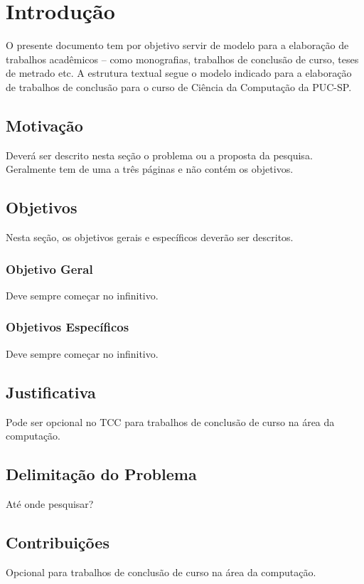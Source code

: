 \chapter{Introdução} \par
O presente documento tem por objetivo servir de modelo para a elaboração de trabalhos acadêmicos --  como monografias, trabalhos de conclusão de curso, teses de metrado etc. A estrutura textual segue o modelo indicado para a elaboração de trabalhos de conclusão para o curso de Ciência da Computação da PUC-SP. 

\section{Motivação}
Deverá ser descrito nesta seção o problema ou a proposta da pesquisa. Geralmente tem de uma a três páginas e não contém os objetivos.

\section{Objetivos}
Nesta seção, os objetivos gerais e específicos deverão ser descritos.

\subsection{Objetivo Geral}
Deve sempre começar no infinitivo.

\subsection{Objetivos Específicos}
Deve sempre começar no infinitivo.

\section{Justificativa}
Pode ser opcional no TCC para trabalhos de conclusão de curso na área da computação.

\section{Delimitação do Problema}
Até onde pesquisar?

\section{Contribuições}
Opcional para trabalhos de conclusão de curso na área da computação.


